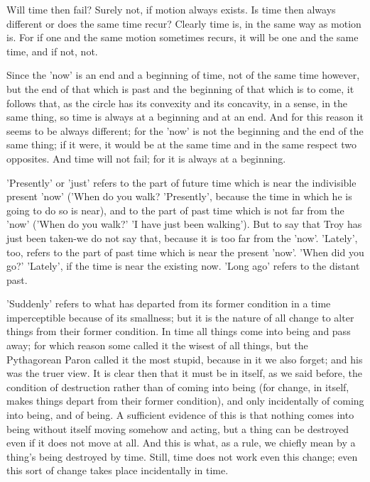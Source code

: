 Will time then fail? Surely not, if motion always exists. Is time
then always different or does the same time recur? Clearly time is,
in the same way as motion is. For if one and the same motion sometimes
recurs, it will be one and the same time, and if not, not.

Since the 'now' is an end and a beginning of time, not of the same
time however, but the end of that which is past and the beginning
of that which is to come, it follows that, as the circle has its convexity
and its concavity, in a sense, in the same thing, so time is always
at a beginning and at an end. And for this reason it seems to be always
different; for the 'now' is not the beginning and the end of the same
thing; if it were, it would be at the same time and in the same respect
two opposites. And time will not fail; for it is always at a beginning.

'Presently' or 'just' refers to the part of future time which is near
the indivisible present 'now' ('When do you walk? 'Presently', because
the time in which he is going to do so is near), and to the part of
past time which is not far from the 'now' ('When do you walk?' 'I
have just been walking'). But to say that Troy has just been taken-we
do not say that, because it is too far from the 'now'. 'Lately', too,
refers to the part of past time which is near the present 'now'. 'When
did you go?' 'Lately', if the time is near the existing now. 'Long
ago' refers to the distant past. 

'Suddenly' refers to what has departed from its former condition in
a time imperceptible because of its smallness; but it is the nature
of all change to alter things from their former condition. In time
all things come into being and pass away; for which reason some called
it the wisest of all things, but the Pythagorean Paron called it the
most stupid, because in it we also forget; and his was the truer view.
It is clear then that it must be in itself, as we said before, the
condition of destruction rather than of coming into being (for change,
in itself, makes things depart from their former condition), and only
incidentally of coming into being, and of being. A sufficient evidence
of this is that nothing comes into being without itself moving somehow
and acting, but a thing can be destroyed even if it does not move
at all. And this is what, as a rule, we chiefly mean by a thing's
being destroyed by time. Still, time does not work even this change;
even this sort of change takes place incidentally in time.

